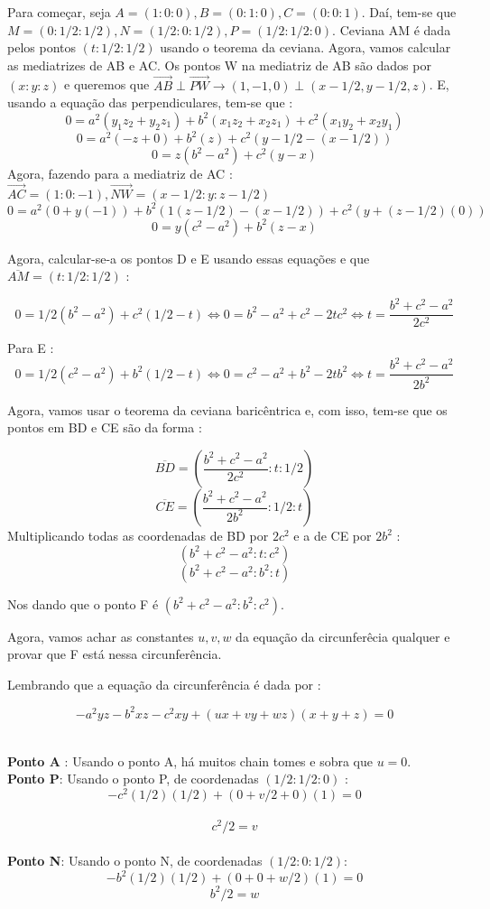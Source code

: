 \documentclass{article}
\begin{document}
Para começar, seja $A = (1:0:0), B =(0:1:0), C= (0:0:1)$. Daí, tem-se que $M = (0:1/2:1/2), N = (1/2 : 0 : 1/2), P = (1/2 : 1/2 : 0)$. Ceviana AM é dada pelos pontos $(t : 1/2 : 1/2)$ usando o teorema da ceviana. Agora, vamos calcular as mediatrizes de AB e AC.
Os pontos W na mediatriz de AB são dados por $(x:y:z)$ e queremos que $\overrightarrow{AB} \perp \overrightarrow{PW} \rightarrow (1,-1,0) \perp (x-1/2, y-1/2 , z)$.
E, usando a equação das perpendiculares,  tem-se que : 
$$
0 = a^2(y_1 z_2 + y_2 z_1) + b^2(x_1 z_2 + x_2 z_1) + c^2 (x_1 y_2 + x_2 y_1)
$$
$$
0 = a^2(-z + 0) + b^2(z) + c^2(y-1/2 -(x-1/2)) 
$$
$$
0 = z(b^2-a^2) + c^2(y-x)
$$
Agora, fazendo para a mediatriz de AC : 
$\overrightarrow{AC} = (1 : 0 : -1), \overrightarrow{NW} = (x-1/2 : y : z - 1/2)$
$$
0 = a^2(0 + y(-1)) + b^2(1(z-1/2) -(x-1/2)) + c^2(y + (z-1/2)(0))
$$
$$
0 = y(c^2-a^2) + b^2(z-x)
$$

\vskip 0.3cm

Agora, calcular-se-a os pontos D e E usando essas equações e que $\overline{AM} = (t:1/2:1/2)$ : 

$$
0 = 1/2(b^2-a^2) + c^2(1/2 - t)
\iff
0 =b^2 - a^2 + c^2 - 2t c^2
\iff
t = \frac{b^2+c^2-a^2}{2c^2}
$$

Para E :
$$
0 = 1/2(c^2-a^2) + b^2(1/2-t)
\iff
0 = c^2-a^2+b^2-2tb^2
\iff
t = \frac{b^2+c^2-a^2}{2b^2}
$$

Agora, vamos usar o teorema da ceviana baricêntrica e, com isso, tem-se que os pontos em BD e CE são da forma : 

$$
\overline{BD} = (\frac{b^2+c^2-a^2}{2c^2} : t : 1/2)
$$
$$
\overline{CE} = (\frac{b^2+c^2-a^2}{2b^2} : 1/2 : t) 
$$
Multiplicando todas as coordenadas de BD por $2c^2$ e a de CE por $2b^2$ : 
$$
(b^2 + c^2 - a^2 : t : c^2)
$$
$$
(b^2+c^2-a^2 : b^2 : t)
$$

Nos dando que o ponto F é $ (b^2+c^2-a^2 : b^2 : c^2)$.

Agora, vamos achar as constantes $u,v,w$ da equação da circunferêcia qualquer e provar que F está nessa circunferência.

Lembrando que a equação da circunferência é dada por : 

$$
-a^2yz -b^2xz -c^2xy + (ux+vy+wz)(x+y+z) = 0
$$

\\
\textbf{Ponto A} :
Usando o ponto A, há muitos chain tomes e sobra que $u = 0.$
\\
\textbf{Ponto P}:
Usando  o ponto P, de coordenadas $(1/2 : 1/2 : 0)$ :
$$
-c^2(1/2)(1/2) + (0 + v/2 + 0)(1) = 0
$$
\\
$$
c^2/2 = v
$$
\\
\textbf{Ponto N}:
Usando o ponto N, de coordenadas $(1/2 : 0 : 1/2)$:
$$
-b^2(1/2)(1/2) + (0 + 0 + w/2)(1) = 0
$$
$$
b^2/2 = w
$$
\end{document}
